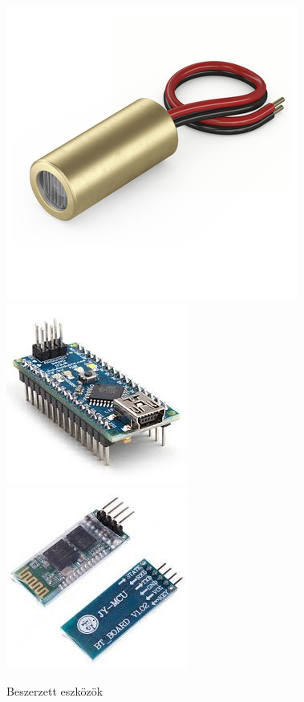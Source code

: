 \documentclass[12pt,a4paper]{article}
\begin{document}
 \begin{figure}[h!]
 	\centering
 	\includegraphics[scale=0.5]{images/laser}
 	\includegraphics[scale=0.5]{images/Arduino_Nano}
	\includegraphics[scale=0.5]{images/HC06}
	\caption{Beszerzett eszközök}
\end{figure}
\end{document}

